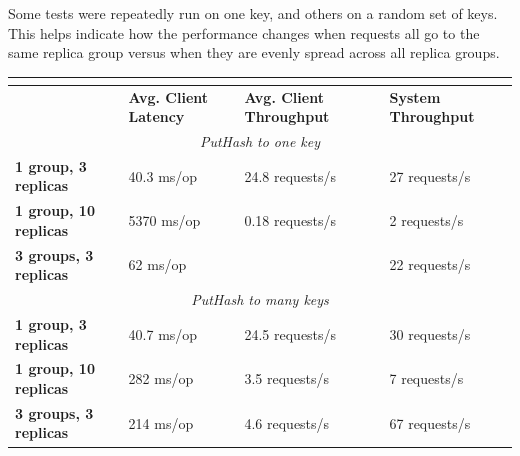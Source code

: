 \documentclass[letterpaper,10pt]{article}
\begin{document}
\begin{itemize}
Some tests were repeatedly run on one key, and others on a random set of keys. This helps indicate how the performance changes when requests all go to the same replica group versus when they are evenly spread across all replica groups.

\begin{table}
\begin{tabular}{|l|l|l|l|}
\hline
\multicolumn{4}{|c|}{\cellcolor[HTML]{C0C0C0}{\color[HTML]{000000} \textbf{Vanilla Paxos}}}                           \\ \hline
                              & \textbf{Avg. Client Latency} & \textbf{Avg. Client Throughput} & \textbf{System Throughput} \\ \hline
\multicolumn{4}{|c|}{\textit{PutHash to one key}}                                                                     \\ \hline
\textbf{1 group, 3 replicas}  & 40.3 ms/op                   & 24.8 requests/s              & 27 requests/s           \\ \hline
\textbf{1 group, 10 replicas} & 5370 ms/op                   & 0.18 requests/s              & 2 requests/s            \\ \hline
\textbf{3 groups, 3 replicas} & 62 ms/op                     &                              & 22 requests/s           \\ \hline
\multicolumn{4}{|c|}{\textit{PutHash to many keys}}                                                                   \\ \hline
\textbf{1 group, 3 replicas}  & 40.7 ms/op                   & 24.5 requests/s              & 30 requests/s           \\ \hline
\textbf{1 group, 10 replicas} & 282 ms/op                    & 3.5 requests/s               & 7 requests/s            \\ \hline
\textbf{3 groups, 3 replicas} & 214 ms/op                    & 4.6 requests/s               & 67 requests/s           \\ \hline
\end{tabular}
\end{table}


\end{itemize}
\end{document}
